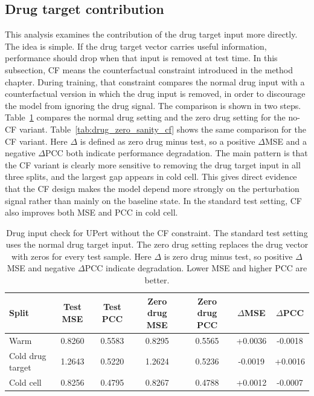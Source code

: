 \subsection{Drug target contribution}
\noindent This analysis examines the contribution of the drug target input more directly. The idea is simple. If the drug target vector carries useful information, performance should drop when that input is removed at test time. In this subsection, CF means the counterfactual constraint introduced in the method chapter. During training, that constraint compares the normal drug input with a counterfactual version in which the drug input is removed, in order to discourage the model from ignoring the drug signal. The comparison is shown in two steps. Table~\ref{tab:drug_zero_sanity_no_cf} compares the normal drug setting and the zero drug setting for the no-CF variant. Table~\ref{tab:drug_zero_sanity_cf} shows the same comparison for the CF variant. Here $\Delta$ is defined as zero drug minus test, so a positive $\Delta$MSE and a negative $\Delta$PCC both indicate performance degradation. The main pattern is that the CF variant is clearly more sensitive to removing the drug target input in all three splits, and the largest gap appears in cold cell. This gives direct evidence that the CF design makes the model depend more strongly on the perturbation signal rather than mainly on the baseline state. In the standard test setting, CF also improves both MSE and PCC in cold cell.

\begin{table}[htbp]
\centering
\caption[No-CF Drug Input Check]{Drug input check for UPert without the CF constraint. The standard test setting uses the normal drug target input. The zero drug setting replaces the drug vector with zeros for every test sample. Here $\Delta$ is zero drug minus test, so positive $\Delta$MSE and negative $\Delta$PCC indicate degradation. Lower MSE and higher PCC are better.}
\label{tab:drug_zero_sanity_no_cf}
\begin{tabular}{lcccccc}
\hline
Split & Test MSE & Test PCC & Zero drug MSE & Zero drug PCC & $\Delta$MSE & $\Delta$PCC \\
\hline
Warm & 0.8260 & 0.5583 & 0.8295 & 0.5565 & +0.0036 & -0.0018 \\
Cold drug target & 1.2643 & 0.5220 & 1.2624 & 0.5236 & -0.0019 & +0.0016 \\
Cold cell & 0.8256 & 0.4795 & 0.8267 & 0.4788 & +0.0012 & -0.0007 \\
\hline
\end{tabular}
\end{table}

